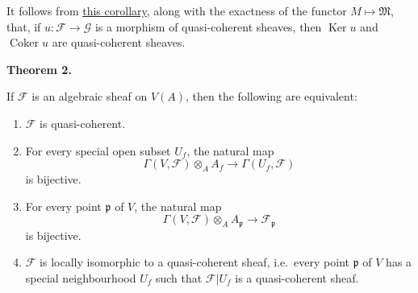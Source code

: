 \documentclass[british]{article}
\providecommand{\tightlist}{%
\setlength{\itemsep}{0pt}\setlength{\parskip}{0pt}}
\newenvironment{itenv}[1]
  {\phantomsection\par\smallskip\noindent\textbf{#1.}\itshape}
  {\par\smallskip}
\begin{document}
It follows from \hyperref[corollary-3]{this corollary}, along with the
exactness of the functor \(M\mapsto\mathfrak{M}\), that, if
\(u\colon{\mathscr{F}}\to{\mathscr{G}}\) is a morphism of quasi-coherent
sheaves, then \(\operatorname{Ker}u\) and \(\operatorname{Coker}u\) are
quasi-coherent sheaves.

\protect{}\label{theorem-2}
\begin{itenv}{Theorem 2}

If \({\mathscr{F}}\) is an algebraic sheaf on \(V(A)\), then the
following are equivalent:

\begin{enumerate}
\def\labelenumi{\alph{enumi}.}
\tightlist
\item
  \({\mathscr{F}}\) is quasi-coherent.
\item
  For every special open subset \(U_f\), the natural map \[
     \Gamma(V,{\mathscr{F}})\otimes_A A_f \to \Gamma(U_f,{\mathscr{F}})
   \] is bijective.
\item
  For every point \(\mathfrak{p}\) of \(V\), the natural map \[
     \Gamma(V,{\mathscr{F}})\otimes_A A_\mathfrak{p} \to {\mathscr{F}}_\mathfrak{p}
   \] is bijective.
\item
  \({\mathscr{F}}\) is locally isomorphic to a quasi-coherent sheaf,
  i.e.~every point \(\mathfrak{p}\) of \(V\) has a special neighbourhood
  \(U_f\) such that \({\mathscr{F}}|U_f\) is a quasi-coherent sheaf.
\end{enumerate}

\end{itenv}
\end{document}
